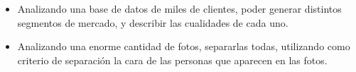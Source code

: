 \documentclass[twoside,twocolumn]{article}
\begin{document}
        \begin{itemize}
          \item Analizando una base de datos de miles de clientes,
                poder generar distintos segmentos de mercado,
                y describir las cualidades de cada uno.
          \item Analizando una enorme cantidad de fotos, separarlas
                todas, utilizando como criterio de separación la cara
                de las personas que aparecen en las fotos.
        \end{itemize}
  

  

  
  
  
  
\end{document}
